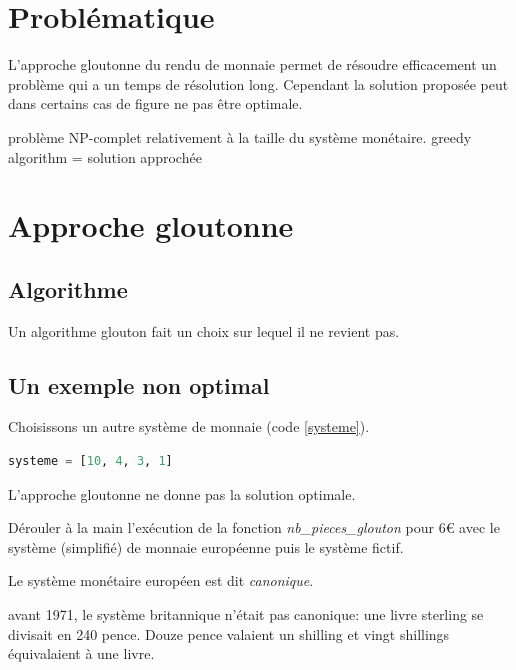 \documentclass[a4paper,11pt]{article}
\begin{document}
\section{Problématique}
L'approche gloutonne du rendu de monnaie permet de résoudre efficacement un problème qui a un temps de résolution long. Cependant la solution proposée peut dans certains cas de figure ne pas être optimale.
\begin{commentprof}
    problème NP-complet relativement à la taille du système monétaire. greedy algorithm = solution approchée
\end{commentprof}
\begin{center}
\end{center}
\section{Approche gloutonne}
\subsection{Algorithme}
Un algorithme glouton fait un choix sur lequel il ne revient pas.
\begin{center}
    
    \label{glouton}
\end{center}

\subsection{Un exemple non optimal}
Choisissons un autre système de monnaie (code \ref{systeme}).
\begin{center}
    \begin{lstlisting}[language=Python]
    systeme = [10, 4, 3, 1]
    \end{lstlisting}
    \label{systeme}
\end{center}
L'approche gloutonne ne donne pas la solution optimale.
\begin{activite}
    Dérouler à la main l'exécution de la fonction \emph{nb\_pieces\_glouton} pour 6€ avec le système (simplifié) de monnaie européenne puis le système fictif.
\end{activite}
\begin{aretenir}[Remarque]
    Le système monétaire européen est dit \emph{canonique}.
\end{aretenir}
\begin{commentprof}
    avant 1971, le système britannique n'était pas canonique: une livre sterling se divisait en 240 pence. Douze pence valaient un shilling et vingt shillings équivalaient à une livre.
\end{commentprof}
\end{document}
